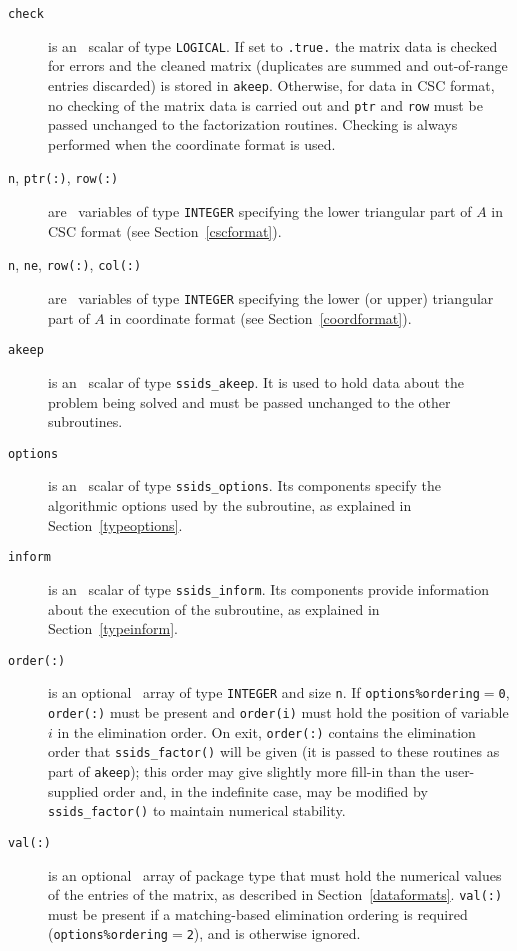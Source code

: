 \documentclass{spral}
\begin{document}
\vspace*{-3mm}
\begin{description}

\item[\texttt{check}] is an \intentin\ scalar of
type  {\tt LOGICAL}. If set to {\tt .true.} the matrix
data is checked for errors and the cleaned matrix
(duplicates are summed and out-of-range entries
discarded) is stored in {\tt akeep}.
Otherwise, for data in CSC format, no checking of the matrix data is carried out
and {\tt ptr} and {\tt row} must be passed unchanged to the factorization routines. 
Checking is always performed when the coordinate format is used.

\item[\texttt{n}{\rm ,} \texttt{ptr(:)}{\rm ,} \texttt{row(:)}] are \intentin\ 
   variables of type {\tt INTEGER} specifying the lower triangular part of $A$
   in CSC format (see Section~\ref{cscformat}).

\item[\texttt{n}{\rm ,} \texttt{ne}{\rm ,} \texttt{row(:)}{\rm ,} \texttt{col(:)}]
   are \intentin\ variables of type {\tt INTEGER} specifying the lower
   (or upper) triangular part of $A$ in coordinate format (see Section~\ref{coordformat}).

\item[\texttt{akeep}] is an \intentout\ scalar of type
{\tt ssids\_akeep}. It is used to hold data about the problem being
solved and must be passed unchanged to the other subroutines.

\item[\texttt{options}] is an \intentin\ scalar of type {\tt ssids\_options}.
Its components specify the algorithmic options used by the subroutine, as
explained in Section~\ref{typeoptions}.

\item[\texttt{inform}] is an \intentout\ scalar of type
{\tt ssids\_inform}. Its components provide information about the execution
of the subroutine, as explained in Section~\ref{typeinform}.

\item[\texttt{order(:)}] is an optional \intentinout\ array of type
{\tt INTEGER} and size {\tt n}. If {\tt options\%ordering}$=${\tt 0},
{\tt order(:)} must be present and {\tt order(i)} must hold the  position of
variable $i$  in the elimination order. On exit, {\tt order(:)} contains the
elimination order that {\tt ssids\_factor()} will be given (it is passed to these
routines as part of {\tt akeep}); this order may give slightly more fill-in
than the user-supplied order and, in the indefinite case, may be modified by
{\tt ssids\_factor()} to maintain numerical stability. 

\item[\texttt{val(:)}] is an optional \intentin\ array of package type that must
hold the numerical values of the entries of the matrix, as described in
Section~\ref{dataformats}.
{\tt val(:)} must be present if a matching-based elimination ordering is
required ({\tt options\%ordering$=$2}), and is otherwise ignored.

\end{description}
\end{document}
